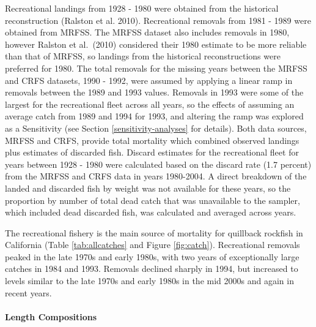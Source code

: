 \documentclass[11pt,
  english,
  letterpaper,
]{article}
\begin{document}
Recreational landings from 1928 - 1980 were obtained from the historical reconstruction {(Ralston et al. 2010)\leavevmode\tagmcend\tagstructend}. Recreational removals from 1981 - 1989 were obtained from MRFSS. The MRFSS dataset also includes removals in 1980, however Ralston et al.~{(2010)\leavevmode\tagmcend\tagstructend} considered their 1980 estimate to be more reliable than that of MRFSS, so landings from the historical reconstructions were preferred for 1980. The total removals for the missing years between the MRFSS and CRFS datasets, 1990 - 1992, were assumed by applying a linear ramp in removals between the 1989 and 1993 values. Removals in 1993 were some of the largest for the recreational fleet across all years, so the effects of assuming an average catch from 1989 and 1994 for 1993, and altering the ramp was explored as a Sensitivity (see Section \ref{sensitivity-analyses} for details). Both data sources, MRFSS and CRFS, provide total mortality which combined observed landings plus estimates of discarded fish. Discard estimates for the recreational fleet for years between 1928 - 1980 were calculated based on the discard rate (1.7 percent) from the MRFSS and CRFS data in years 1980-2004. A direct breakdown of the landed and discarded fish by weight was not available for these years, so the proportion by number of total dead catch that was unavailable to the sampler, which included dead discarded fish, was calculated and averaged across years.

\leavevmode\tagmcend\tagstructend\par


The recreational fishery is the main source of mortality for quillback rockfish in California (Table \ref{tab:allcatches} and Figure \ref{fig:catch}). Recreational removals peaked in the late 1970s and early 1980s, with two years of exceptionally large catches in 1984 and 1993. Removals declined sharply in 1994, but increased to levels similar to the late 1970s and early 1980s in the mid 2000s and again in recent years.

\leavevmode\tagmcend\tagstructend\par


\hypertarget{length-compositions-1}{%
\paragraph{Length Compositions}\label{length-compositions-1}}
\end{document}
